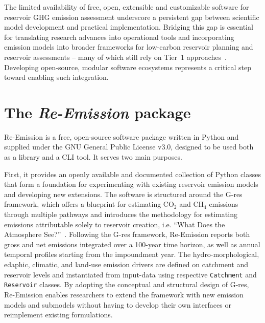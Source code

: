 \documentclass[review, authoryear, 1p]{elsarticle} %
\begin{document}
The limited availability of free, open, extensible and customizable software for reservoir \ac{GHG} emission assessment underscore a persistent gap between scientific model development and practical implementation.
Bridging this gap is essential for translating research advances into operational tools and incorporating emission models into broader frameworks for low-carbon reservoir planning and reservoir assessments -- many of which still rely on Tier~1 approaches~\cite{Almeida2019, Carlino2024, Tangi2024}.
Developing open-source, modular software ecosystems represents a critical step toward enabling such integration. %

\section{The \emph{Re-Emission} package}
\label{sec:reemission}

Re-Emission is a free, open-source software package written in Python and supplied under the GNU General Public License v3.0, designed to be used both as a library and a \acf{CLI} tool. It serves two main purposes.

First, it provides an openly available and documented collection of Python classes that form a foundation for experimenting with existing reservoir emission models and developing new extensions.
The software is structured around the G-res framework, which offers a blueprint for estimating CO$_2$ and CH$_4$ emissions through multiple pathways and introduces the methodology for estimating emissions attributable solely to reservoir creation, i.e. ``What Does the Atmosphere See?''~\citep{Prairie2018}.
Following the G-res framework, Re-Emission reports both gross and net emissions integrated over a 100-year time horizon, as well as annual temporal profiles starting from the impoundment year.
The hydro-morphological, edaphic, climatic, and land-use emission drivers are defined on catchment and reservoir levels and instantiated from input-data using respective \texttt{Catchment} and \texttt{Reservoir} classes.
By adopting the conceptual and structural design of G-res, Re-Emission enables researchers to extend the framework with new emission models and submodels without having to develop their own interfaces or reimplement existing formulations.
\end{document}
